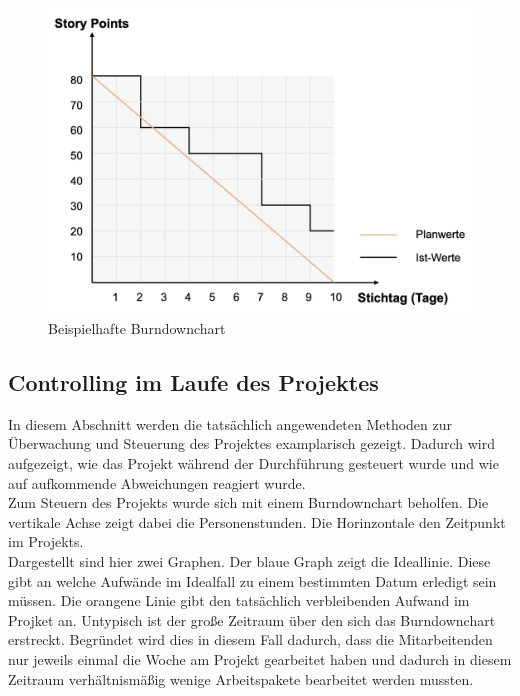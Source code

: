 \documentclass[ThesisDJ.tex]{subfiles}
\begin{document}
    \begin{figure}
        \includegraphics[scale=0.5]{burndown.png}
        \centering
        \caption{Beispielhafte Burndownchart}
        \label{fig:burndown}
    \end{figure}

    \subsection{Controlling im Laufe des Projektes}
    In diesem Abschnitt werden die tatsächlich angewendeten Methoden zur Überwachung und Steuerung des 
    Projektes examplarisch gezeigt. Dadurch wird aufgezeigt, wie das Projekt während der Durchführung gesteuert wurde 
    und wie auf aufkommende Abweichungen reagiert wurde.\\
    Zum Steuern des Projekts wurde sich mit einem Burndownchart beholfen. Die vertikale Achse zeigt dabei die Personenstunden. Die Horinzontale den Zeitpunkt im Projekts.\\
Dargestellt sind hier zwei Graphen. Der blaue Graph zeigt die Ideallinie. Diese gibt an welche Aufwände im Idealfall zu einem bestimmten Datum erledigt sein müssen. Die orangene Linie gibt den tatsächlich verbleibenden Aufwand im Projket an. Untypisch ist der große Zeitraum über den sich das Burndownchart erstreckt. Begründet wird dies in diesem Fall dadurch, dass die Mitarbeitenden nur jeweils einmal die Woche am Projekt gearbeitet haben und dadurch in diesem Zeitraum verhältnismäßig wenige Arbeitspakete bearbeitet werden mussten.
\end{document}
